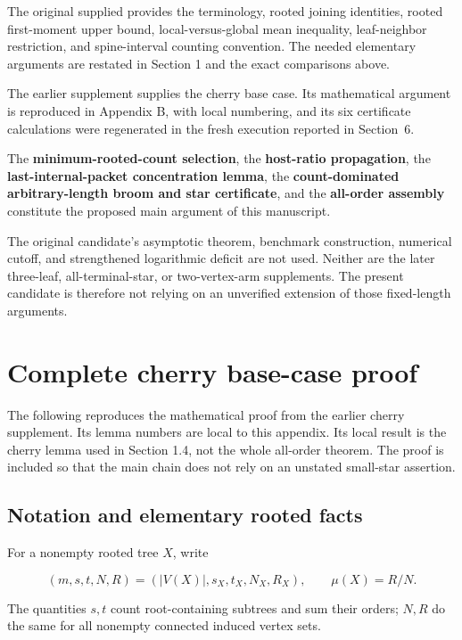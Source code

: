 \documentclass[11pt,reqno]{amsart}
\theoremstyle{plain}
\begin{document}
The original supplied  provides the terminology, rooted joining identities, rooted first-moment upper bound, local-versus-global mean inequality, leaf-neighbor restriction, and spine-interval counting convention. The needed elementary arguments are restated in Section 1 and the exact comparisons above.

The earlier supplement  supplies the cherry base case. Its mathematical argument is reproduced in Appendix B, with local numbering, and its six certificate calculations were regenerated in the fresh execution reported in Section~6.

The \textbf{minimum-rooted-count selection}, the \textbf{host-ratio propagation}, the \textbf{last-internal-packet concentration lemma}, the \textbf{count-dominated arbitrary-length broom and star certificate}, and the \textbf{all-order assembly} constitute the proposed main argument of this manuscript.

The original candidate's asymptotic theorem, benchmark construction, numerical cutoff, and strengthened logarithmic deficit are not used. Neither are the later three-leaf, all-terminal-star, or two-vertex-arm supplements. The present candidate is therefore not relying on an unverified extension of those fixed-length arguments.

\section{Complete cherry base-case proof}\label{appendix-b.-complete-cherry-base-case-proof}

The following reproduces the mathematical proof from the earlier cherry supplement. Its lemma numbers are local to this appendix. Its local result is the cherry lemma used in Section 1.4, not the whole all-order theorem. The proof is included so that the main chain does not rely on an unstated small-star assertion.

\subsection{Notation and elementary rooted facts}\label{b.1.-notation-and-elementary-rooted-facts}

For a nonempty rooted tree \(X\), write

\[
(m,s,t,N,R)=(|V(X)|,s_X,t_X,N_X,R_X),\qquad \mu(X)=R/N.
\]

The quantities \(s,t\) count root-containing subtrees and sum their orders; \(N,R\) do the same for all nonempty connected induced vertex sets.
\end{document}
